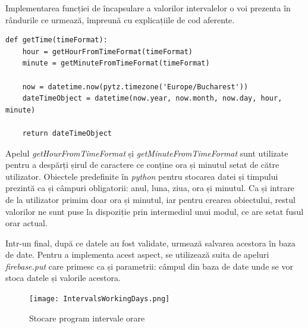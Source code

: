 	Implementarea funcției de încapsulare a valorilor intervalelor o voi prezenta în rândurile ce urmează, împreună cu explicațiile de cod aferente. 

\vspace{1em}
\begin{lstlisting}
def getTime(timeFormat):
    hour = getHourFromTimeFormat(timeFormat)
    minute = getMinuteFromTimeFormat(timeFormat)

    now = datetime.now(pytz.timezone('Europe/Bucharest'))
    dateTimeObject = datetime(now.year, now.month, now.day, hour, minute)

    return dateTimeObject
\end{lstlisting}
\vspace{2em} 

	Apelul \textit{getHourFromTimeFormat} și \textit{getMinuteFromTimeFormat} sunt utilizate pentru a despărți șirul de caractere ce conține ora și minutul setat de către utilizator. Obiectele predefinite în \textit{python} pentru stocarea datei și timpului prezintă ca și câmpuri obligatorii: anul, luna, ziua, ora și minutul. Ca și intrare de la utilizator primim doar ora și minutul, iar pentru crearea obiectului, restul valorilor ne sunt puse la dispoziție prin intermediul unui modul, ce are setat fusul orar actual. 

	Intr-un final, după ce datele au fost validate, urmează salvarea acestora în baza de date. Pentru a implementa acest aspect, se utilizează suita de apeluri \textit{firebase.put} care primesc ca și parametrii: câmpul din baza de date unde se vor stoca datele și valorile acestora.

\begin{figure}[H]
   	\centering
    	\texttt{[image: IntervalsWorkingDays.png]}
	\caption{Stocare program intervale orare}
\end{figure}

	